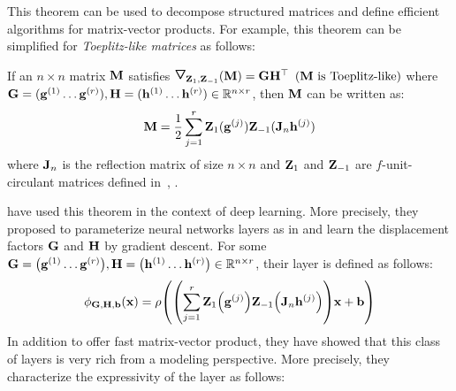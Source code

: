 \noindent
This theorem can be used to decompose structured matrices and define efficient algorithms for matrix-vector products.
For example, this theorem can be simplified for \emph{Toeplitz-like matrices} as follows:
\begin{theorem}
  If an $n \times n$ matrix $\mathbf{M}$ satisfies $\triangleopdown_{\Zmat_1, \Zmat_{-1}}(\Mmat) = \Gmat \Hmat^\top$ $(\mathbf{M} \text{ is Toeplitz-like})$ where $\mathbf{G} = (\mathbf{g} ^{(1)} \ldots \mathbf{g}^{(r)}), \mathbf{H} = (\mathbf{h}^{(1)} \ldots \mathbf{h}^{(r)}) \in \mathbb{R}^{n \times r}$, then $\mathbf{M}$ can be written as: 
  \begin{equation} \label{equation:ch3-toeplitz_like_matrix_decomposition}
    \mathbf{M} = \frac{1}{2} \sum_{j=1}^{r} \mathbf{Z}_1(\mathbf{g}^{(j)}) \mathbf{Z}_{-1}(\mathbf{J}_n \mathbf{h}^{(j)})
  \end{equation}
  where $\mathbf{J}_n$ is the reflection matrix of size $n \times n$ and $\mathbf{Z}_1$ and $\mathbf{Z}_{-1}$ are $f$-unit-circulant matrices defined in~, .
\end{theorem}
\noindent
\citet{sindhwani2015structured} have used this theorem in the context of deep learning.
More precisely, they proposed to parameterize neural networks layers as in  and learn the displacement factors $\mathbf{G}$ and $\mathbf{H}$ by gradient descent. 
For some $\Gmat = \leftmat \gvec^{(1)} \ldots \gvec^{(r)} \rightmat, \Hmat = \leftmat \hvec^{(1)} \ldots \hvec^{(r)} \rightmat \in \Rbb^{n \times r}$, their layer is defined as follows:
\begin{equation}
  \layer_{\Gmat, \Hmat, \bvec}(\xvec) = \act \left( \left(\sum_{j=1}^{r} \Zmat_1\left(\gvec^{(j)}\right) \Zmat_{-1}\left(\Jmat_n \hvec^{(j)}\right) \right) \xvec + \bvec \right)
\end{equation}
\noindent
In addition to offer fast matrix-vector product, they have showed that this class of layers is very rich from a modeling perspective.
More precisely, they characterize the expressivity of the layer as follows: 
